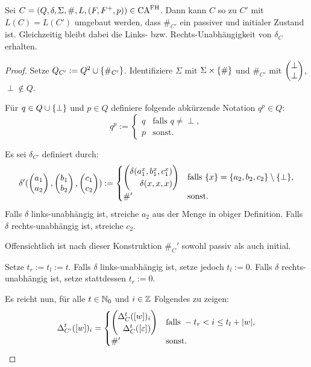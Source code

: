 \begin{satz}
    Sei $C = (Q, \delta, \Sigma, \#, L, (F, F^+, p)) \in \textrm{CA}^{\textrm{FH}}$.
    Dann kann $C$ so zu $C'$ mit $L(C) = L(C')$ umgebaut werden, dass $\#_{C'}$ ein passiver und initialer Zustand ist.
    Gleichzeitig bleibt dabei die Links- \acs{bzw.} Rechts-Unabhängigkeit von $\delta_C$ erhalten.
\end{satz}
\begin{proof}
    Setze $Q_{C'} := Q^2 \cup \{ { \#_{C'} } \}$. Identifiziere $\Sigma$ mit $ \Sigma \times \{ {\#} \}$ und $\#_{C'}$ mit $\Spvek{\perp; \perp}$, $\perp \not\in Q$.

    Für $q \in Q \cup \{ {\perp} \}$ und $p \in Q$ definiere folgende abkürzende Notation $q^p \in Q$:
    \[
        q^p := 
        \begin{cases}
            q & \text{falls } q \neq \perp, \\
            p & \text{sonst.}
        \end{cases}
    \]
    
    Es sei $\delta_{C'}$ definiert durch:
    \[
       \delta'(\Spvek{a_1; a_2}, \Spvek{b_1; b_2}, \Spvek{c_1; c_2}) :=
       \begin{cases}
         \Spvek{  \delta(a_1 ^ {x}, b_1 ^ {x}, c_1 ^ {x}); \delta(x, x, x)  } 
         & \text{falls }
         \finset{x} = \finset{a_2, b_2, c_2} \setminus \finset{ \perp }, \\
         \#'
         & \text{sonst.}
       \end{cases}
    \]
    Falls $\delta$ links-unabhängig ist, streiche $a_2$ aus der Menge in obiger Definition.
    Falls $\delta$ rechts-unabhängig ist, streiche $c_2$.
    
    Offensichtlich ist nach dieser Konstruktion $\#_C'$ sowohl passiv als auch initial.
    
    Setze $t_r := t_l := t$.
    Falls $\delta$ links-unabhängig ist, setze jedoch $t_l := 0$.
    Falls $\delta$ rechts-unabhängig ist, setze stattdessen $t_r := 0$.
    
    Es reicht nun, für alle $t \in \mathbb{N}_0$ und $i \in \mathbb{Z}$ Folgendes zu zeigen:
    \[
        \Delta_{C'}^t([w])_i = \begin{cases}
            \Spvek{\Delta_C^t([w])_i; \Delta^t_{C}([\varepsilon])} &
                \text{falls } -t_r < i \leq t_l + |w|, \\
            \#' & \text{sonst.}
        \end{cases}
    \]
    

\end{proof}
